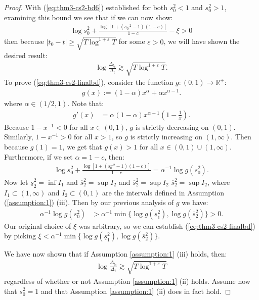 \documentclass{article}
\begin{document}
\begin{proof}
With (\ref{eq:thm3-cs2-bd6}) established for both $s_0^2 < 1$ and $s_0^2 > 1$, examining this bound we see that if we can now show:
\begin{align}
    \log s_0^2 + \frac{\log[1 +  (s_0^{-2} -1)(1-c)]}{1-c} - \xi > 0 \label{eq:thm3-cs2-finalbd}
\end{align}
then because $|t_0-t| \geq \sqrt{T \log^{1+\varepsilon} T}$ for some $\varepsilon > 0$, we will have shown the desired result:
\begin{align*}
    \log \frac{\Delta_{t_0}}{\Delta_t} \gtrsim \sqrt{T \log^{1+\varepsilon} T}.
\end{align*}
To prove (\ref{eq:thm3-cs2-finalbd}), consider the function $g: (0,1) \to \mathbb{R}^+$:
\begin{align*}
    g(x) := (1-\alpha)x^\alpha + \alpha x^{\alpha - 1}.
\end{align*}
where $\alpha \in (1/2,1)$. Note that:
\begin{align*}
    g'(x) &= \alpha(1-\alpha)x^{\alpha-1}\left(1 - \frac{1}{x}
    \right).
\end{align*}
Because $1 - x^{-1} < 0$ for all $x \in (0,1)$, $g$ is strictly decreasing on $(0,1)$. Similarly, $1 - x^{-1} > 0$ for all $x > 1$, so $g$ is strictly increasing on $(1,\infty)$. Then because $g(1) = 1$, we get that $g(x) > 1$ for all $x \in (0,1)\cup(1,\infty)$. Furthermore, if we set $\alpha = 1 - c$, then:
\begin{align*}
    \log s_0^2 + \frac{\log[1 +  (s_0^{-2} -1)(1-c)]}{1-c} = \alpha^{-1}\log g(s_0^2).
\end{align*}
Now let $\underline{s}^2_2 = \inf I_1$ and $\overline{s}^2_2 = \sup I_2$ and $\overline{s}^2_2 = \sup I_2$ $\overline{s}^2_2 = \sup I_2$, where $I_1 \subset (1,\infty)$ and $I_2 \subset (0,1)$ are the intervals defined in Assumption (\ref{assumption:1}) (iii). Then by our previous analysis of $g$ we have:
\begin{align*}
    \alpha^{-1}\log g(s_0^2) &> \alpha^{-1}\min\{\log g(\underline{s}^2_1), \log g(\overline{s}^2_2)\} > 0.
\end{align*}
Our original choice of $\xi$ was arbitrary, so we can establish (\ref{eq:thm3-cs2-finalbd}) by picking $\xi < \alpha^{-1}\min\{\log g(\underline{s}^2_1), \log g(\overline{s}^2_2)\}.$

We have now shown that if Assumption \ref{assumption:1} (iii) holds, then:
\begin{align*}
    \log \frac{\Delta_{t_0}}{\Delta_t} \gtrsim \sqrt{T \log^{1+\varepsilon} T}
\end{align*}
regardless of whether or not Assumption \ref{assumption:1} (ii) holds. Assume now that $s_0^2 = 1$ and that Assumption \ref{assumption:1} (ii) does in fact hold. 


\end{proof}
\end{document}
